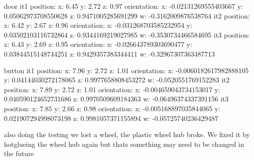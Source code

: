 door
it1
  position:
    x: 6.45
    y: 2.72
    z: 0.97
  orientation:
    x: -0.02131269555403667
    y: 0.05062973708550628
    z: 0.9471005285691299
    w: -0.3162009876538764
it2
  position:
    x: 6.42
    y: 2.67
    z: 0.96
  orientation:
    x: -0.031268703585232954
    y: 0.03502103116732864
    z: 0.9344169219027985
    w: -0.3530734466584695
it3
  position:
    x: 6.43
    y: 2.69
    z: 0.95
  orientation:
    x: -0.026643789303690477
    y: 0.03844515148744251
    z: 0.9429357383344411
    w: -0.32967307363487713

button
it1
  position:
    x: 7.96
    y: 2.72
    z: 1.01
  orientation:
    x: -0.0060182617982888105
    y: 0.04144030272178065
    z: 0.9977658808453272
    w: -0.0520551769152283
it2
  position:
    x: 7.89
    y: 2.72
    z: 1.01
  orientation:
    x: -0.004659043734153017
    y: 0.040590124652731686
    z: 0.9970509609184363
    w: -0.06496374337391156
it3
  position:
    x: 7.85
    y: 2.66
    z: 0.98
  orientation:
    x: -0.005168897035844065
    y: 0.021907294998073198
    z: 0.9981057371155894
    w: -0.05725740236429487


also doing the testing we lost a wheel, the plastic wheel hub broke. We fixed it by hotglueing the wheel hub again but thats something may need to be changed in the future